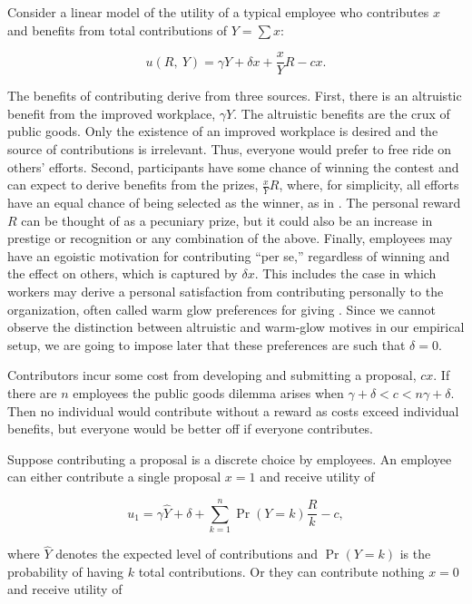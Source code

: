 \documentclass[12pt, titlepage]{article}
\begin{document}
Consider a linear model of the utility of a typical employee who
contributes \(x\) and benefits from total contributions of \(Y=\sum x\):

\begin{equation} \label{eq:utility}
  u(R,~ Y) =  \gamma Y + \delta x + \frac{x}{Y} R - c x.
\end{equation}

The benefits of contributing derive from three sources. First, there is
an altruistic benefit from the improved workplace, \(\gamma Y\). The
altruistic benefits are the crux of public goods. Only the existence of
an improved workplace is desired and the source of contributions is
irrelevant. Thus, everyone would prefer to free ride on others' efforts.
Second, participants have some chance of winning the contest and can
expect to derive benefits from the prizes, \(\frac{x}{Y} R\), where, for
simplicity, all efforts have an equal chance of being selected as the
winner, as in \citet{morgan2000financing}. The personal reward \(R\) can
be thought of as a pecuniary prize, but it could also be an increase in
prestige or recognition or any combination of the above. Finally,
employees may have an egoistic motivation for contributing ``per se,''
regardless of winning and the effect on others, which is captured by
\(\delta x\). This includes the case in which workers may derive a
personal satisfaction from contributing personally to the organization,
often called warm glow preferences for giving \citep{andreoni1995warm}.
Since we cannot observe the distinction between altruistic and warm-glow
motives in our empirical setup, we are going to impose later that these
preferences are such that \(\delta=0\).

Contributors incur some cost from developing and submitting a proposal,
\(c x\). If there are \(n\) employees the public goods dilemma arises
when \(\gamma+\delta < c < n\gamma+\delta\). Then no individual would
contribute without a reward as costs exceed individual benefits, but
everyone would be better off if everyone contributes.

Suppose contributing a proposal is a discrete choice by employees. An
employee can either contribute a single proposal \(x=1\) and receive
utility of

\begin{equation}
    u_1 = \gamma \hat Y + \delta + \sum_{k=1}^{n}\Pr(Y=k)\frac{R}{k}  - c, 
\end{equation}

where \(\hat Y\) denotes the expected level of contributions and
\(\Pr(Y=k)\) is the probability of having \(k\) total contributions. Or
they can contribute nothing \(x=0\) and receive utility of
\end{document}
